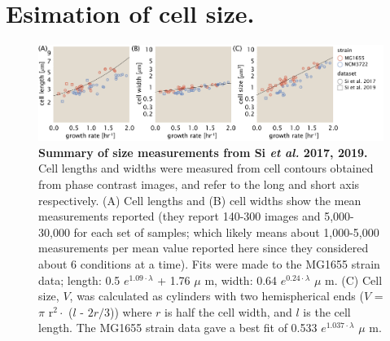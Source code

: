 \section{Esimation of cell size.}



\begin{figure}
		\centering
    \includegraphics[width=1.0\textwidth]{SI_figs/final_cell_size_Si.pdf}
  \caption{\textbf{Summary of size measurements from Si \textit{et al.} 2017, 2019.}
	 	 Cell lengths and widths were measured from cell contours obtained from
	 	 phase contrast images, and refer to the long and short axis respectively.
	 	 (A) Cell lengths and (B) cell widths show the mean measurements reported
	 	 (they report 140-300 images and 5,000-30,000 for each set of samples;
	 	 which likely means about 1,000-5,000 measurements per mean value reported
	 	 here since they considered about 6 conditions at a time). Fits were made
	 	 to the  MG1655 strain data; length: 0.5 $e^{1.09 \cdot \lambda}$ + 1.76
	 	 $\mu$ m, width:  0.64 $e^{0.24 \cdot \lambda}$ $\mu$ m. (C) Cell size,
	 	 $V$, was calculated as cylinders with two hemispherical ends
     ($V$ = $\pi$ r$^2 \cdot$ ($l$ - $2r/3$)) where $r$ is half the cell width, and $l$ is the cell
	 	 length. The MG1655 strain data gave a best fit of 0.533 $e^{1.037 \cdot \lambda}$ $\mu$ m.}
  \label{fig:final_size_data_Si}
\end{figure}
